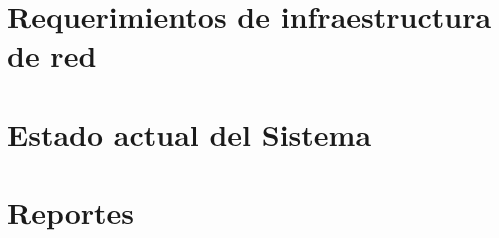 \documentclass[
    language=spanish,
    school=esdf,
    docstage=final,
    media=paper,
    bookprint=false,
    linkcolor=red!45!black,
    chapterstyle=classic,
    coverstyle=classic,
    aiacknowledgement=true,
    listprefix=false
]{IPLeiriaThesis}
\begin{document}






%
%

\bookmarktocentry\tableofcontents
\listoffigures
\listoftables

\glossarytoc\printnormalglossary
\acronymtoc\printacronymglossary
\symboltoc\printsymbolglossary



\part{Requerimientos de infraestructura de red}






\part{Estado actual del Sistema}




\part{Reportes}



\end{document}
